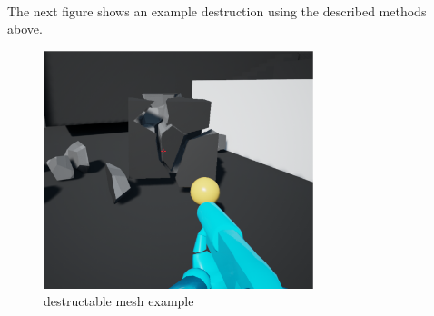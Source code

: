 \documentclass[12pt]{article}
\begin{document}
\\
The next figure shows an example destruction using the described methods above.
\begin{figure}[ht]
	\centering
  \includegraphics[width=0.7\textwidth]{destrExample.eps}
	\caption{destructable mesh example}
\end{figure}
\\
\end{document}
